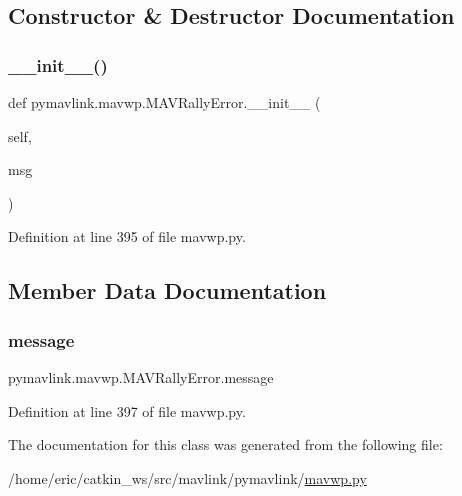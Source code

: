 \subsection{Constructor \& Destructor Documentation}
\mbox{\label{classpymavlink_1_1mavwp_1_1MAVRallyError_ae934706d7f853e9a93e7ce5b9c6feba4}} 
\subsubsection{\texorpdfstring{\_\_init\_\_()}{\_\_init\_\_()}}
{\footnotesize\ttfamily def pymavlink.\+mavwp.\+M\+A\+V\+Rally\+Error.\+\_\+\+\_\+init\+\_\+\+\_\+ (\begin{DoxyParamCaption}\item[{}]{self,  }\item[{}]{msg }\end{DoxyParamCaption})}



Definition at line 395 of file mavwp.\+py.



\subsection{Member Data Documentation}
\mbox{\label{classpymavlink_1_1mavwp_1_1MAVRallyError_aa6a58e51c7b80f467341193dd32237d0}} 
\subsubsection{\texorpdfstring{message}{message}}
{\footnotesize\ttfamily pymavlink.\+mavwp.\+M\+A\+V\+Rally\+Error.\+message}



Definition at line 397 of file mavwp.\+py.



The documentation for this class was generated from the following file\+:\begin{DoxyCompactItemize}
\item 
/home/eric/catkin\+\_\+ws/src/mavlink/pymavlink/\mbox{\hyperlink{mavwp_8py}{mavwp.\+py}}\end{DoxyCompactItemize}
